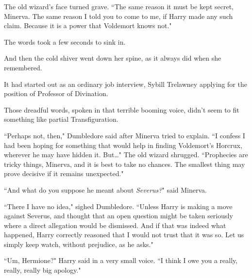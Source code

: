 The old wizard's face turned grave. ``The same reason it must be kept secret, Minerva. The same reason I told you to come to me, if Harry made any such claim. Because it is a power that Voldemort knows not."

The words took a few seconds to sink in.

And then the cold shiver went down her spine, as it always did when she remembered.

It had started out as an ordinary job interview, Sybill Trelawney applying for the position of Professor of Divination.


Those dreadful words, spoken in that terrible booming voice, didn't seem to fit something like partial Transfiguration.

``Perhaps not, then," Dumbledore said after Minerva tried to explain. ``I confess I had been hoping for something that would help in finding Voldemort's Horcrux, wherever he may have hidden it. But{\ldots}" The old wizard shrugged. ``Prophecies are tricky things, Minerva, and it is best to take no chances. The smallest thing may prove decisive if it remains unexpected."

``And what do you suppose he meant about \emph{Severus?}" said Minerva.

``There I have no idea," sighed Dumbledore. ``Unless Harry is making a move against Severus, and thought that an open question might be taken seriously where a direct allegation would be dismissed. And if that was indeed what happened, Harry correctly reasoned that I would not trust that it was so. Let us simply keep watch, without prejudice, as he asks."


``Um, Hermione?" Harry said in a very small voice. ``I think I owe you a really, really, really big apology."



